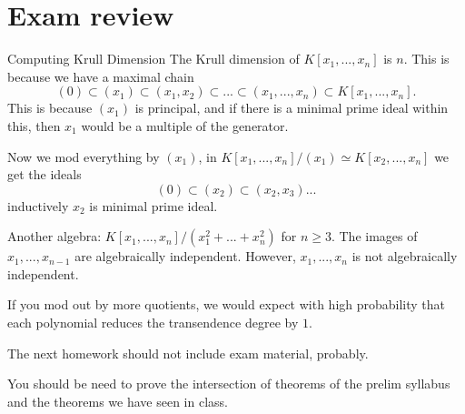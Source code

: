 \section{Exam review}

\begin{aexample}{Computing Krull Dimension}{}
    The Krull dimension of $K[x_1,...,x_n]$ is $n$.
    This is because we have a maximal chain \[
    (0)\subset (x_1) \subset(x_1,x_2)\subset...\subset (x_1,...,x_n)\subset K[x_1,...,x_n].
    \]
    This is because $(x_1)$ is principal, and if there is a minimal prime ideal within this, then $x_1$ would be a multiple of the generator.

    Now we mod everything by $(x_1)$, in $K[x_1,...,x_n]/(x_1) \simeq K[x_2,...,x_n]$ we get the ideals \[
    (0)\subset (x_2)\subset (x_2,x_3)...
    \]
    inductively $x_2$ is minimal prime ideal. 


    Another algebra: $K[x_1,...,x_n]/(x_1^2+...+x_n^2)$ for $n\geq 3$. The images of $x_1,...,x_{n-1}$ are algebraically independent. However, $x_1,...,x_n$ is not algebraically independent. 

    If you mod out by more quotients, we would expect with high probability that each polynomial reduces the transendence degree by $1$.
\end{aexample}

\begin{remark}
    The next homework should not include exam material, probably. 
\end{remark}
\begin{remark}
    You should be need to prove the intersection of theorems of the prelim syllabus and the theorems we have seen in class.
\end{remark}


